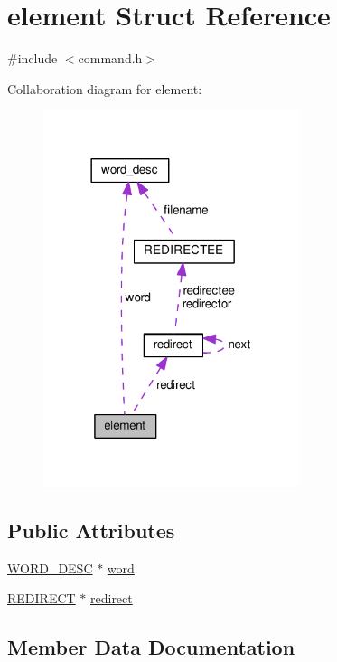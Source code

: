 \hypertarget{structelement}{}\section{element Struct Reference}
\label{structelement}


{\ttfamily \#include $<$command.\+h$>$}



Collaboration diagram for element\+:
\nopagebreak
\begin{figure}[H]
\begin{center}
\leavevmode
\includegraphics[width=213pt]{structelement__coll__graph}
\end{center}
\end{figure}
\subsection*{Public Attributes}
\begin{DoxyCompactItemize}
\item 
\hyperlink{command_8h_a3f0cccf333703e5f6c4168be0db675fa}{W\+O\+R\+D\+\_\+\+D\+E\+SC} $\ast$ \hyperlink{structelement_a74c8c3c3cf92b8287e450fab71ed2074}{word}
\item 
\hyperlink{command_8h_adeb9f5d937c92c7923aec48ad5e47d57}{R\+E\+D\+I\+R\+E\+CT} $\ast$ \hyperlink{structelement_ad3f13da7e9bdbe54746af382c8b6d9e5}{redirect}
\end{DoxyCompactItemize}


\subsection{Member Data Documentation}
